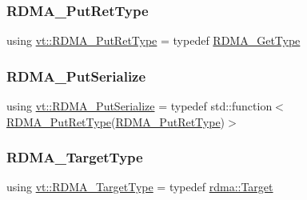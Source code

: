 \mbox{\label{namespacevt_a50fcc3338d68f7b147b99c0a82ec3a10}} 
\subsubsection{\texorpdfstring{R\+D\+M\+A\+\_\+\+Put\+Ret\+Type}{RDMA\_PutRetType}}
{\footnotesize\ttfamily using \hyperlink{namespacevt_a50fcc3338d68f7b147b99c0a82ec3a10}{vt\+::\+R\+D\+M\+A\+\_\+\+Put\+Ret\+Type} = typedef \hyperlink{namespacevt_a1cab7f4860f65a49ad2c042d6240f288}{R\+D\+M\+A\+\_\+\+Get\+Type}}

\mbox{\label{namespacevt_abeb0129c92a5721f6f2c01b621f149fe}} 
\subsubsection{\texorpdfstring{R\+D\+M\+A\+\_\+\+Put\+Serialize}{RDMA\_PutSerialize}}
{\footnotesize\ttfamily using \hyperlink{namespacevt_abeb0129c92a5721f6f2c01b621f149fe}{vt\+::\+R\+D\+M\+A\+\_\+\+Put\+Serialize} = typedef std\+::function$<$\hyperlink{namespacevt_a50fcc3338d68f7b147b99c0a82ec3a10}{R\+D\+M\+A\+\_\+\+Put\+Ret\+Type}(\hyperlink{namespacevt_a50fcc3338d68f7b147b99c0a82ec3a10}{R\+D\+M\+A\+\_\+\+Put\+Ret\+Type})$>$}

\mbox{\label{namespacevt_a9bf03a57102d0274cc229b9ef94bb59e}} 
\subsubsection{\texorpdfstring{R\+D\+M\+A\+\_\+\+Target\+Type}{RDMA\_TargetType}}
{\footnotesize\ttfamily using \hyperlink{namespacevt_a9bf03a57102d0274cc229b9ef94bb59e}{vt\+::\+R\+D\+M\+A\+\_\+\+Target\+Type} = typedef \hyperlink{structvt_1_1rdma_1_1_target}{rdma\+::\+Target}}

\mbox{\label{namespacevt_a60fda95dc2316580f0ccf87d570f1d9e}} 

